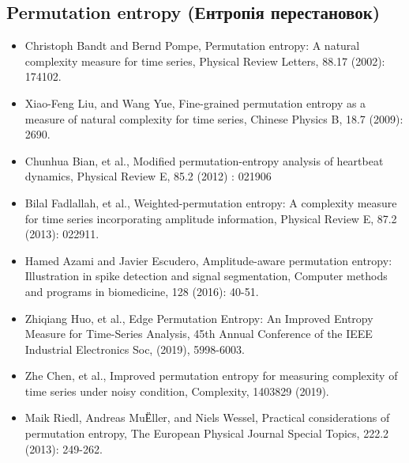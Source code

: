 \documentclass[
  letterpaper,
]{report}
\providecommand{\tightlist}{%
  \setlength{\itemsep}{0pt}\setlength{\parskip}{0pt}}\usepackage{longtable,booktabs,array}
\begin{document}
\hypertarget{permutation-entropy-ux435ux43dux442ux440ux43eux43fux456ux44f-ux43fux435ux440ux435ux441ux442ux430ux43dux43eux432ux43eux43a}{%
\subsection{Permutation entropy (Ентропія
перестановок)}\label{permutation-entropy-ux435ux43dux442ux440ux43eux43fux456ux44f-ux43fux435ux440ux435ux441ux442ux430ux43dux43eux432ux43eux43a}}

\begin{itemize}
\tightlist
\item
  Christoph Bandt and Bernd Pompe, Permutation entropy: A natural
  complexity measure for time series, Physical Review Letters, 88.17
  (2002): 174102.
\item
  Xiao-Feng Liu, and Wang Yue, Fine-grained permutation entropy as a
  measure of natural complexity for time series, Chinese Physics B, 18.7
  (2009): 2690.
\item
  Chunhua Bian, et al., Modiﬁed permutation-entropy analysis of
  heartbeat dynamics, Physical Review E, 85.2 (2012) : 021906
\item
  Bilal Fadlallah, et al., Weighted-permutation entropy: A complexity
  measure for time series incorporating amplitude information, Physical
  Review E, 87.2 (2013): 022911.
\item
  Hamed Azami and Javier Escudero, Amplitude-aware permutation entropy:
  Illustration in spike detection and signal segmentation, Computer
  methods and programs in biomedicine, 128 (2016): 40-51.
\item
  Zhiqiang Huo, et al., Edge Permutation Entropy: An Improved Entropy
  Measure for Time-Series Analysis, 45th Annual Conference of the IEEE
  Industrial Electronics Soc, (2019), 5998-6003.
\item
  Zhe Chen, et al., Improved permutation entropy for measuring
  complexity of time series under noisy condition, Complexity, 1403829
  (2019).
\item
  Maik Riedl, Andreas MuЁller, and Niels Wessel, Practical
  considerations of permutation entropy, The European Physical Journal
  Special Topics, 222.2 (2013): 249-262.
\end{itemize}
\end{document}
